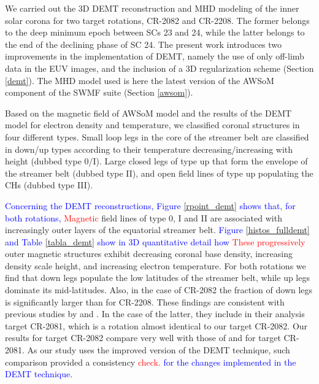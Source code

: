 \documentclass[namedreferences]{solarphysics}
\def\edit#1{\textcolor{Red}{#1}}
\def\del#1{\textcolor{Blue}{#1}}
\begin{document}
\begin{article}
We carried out the 3D DEMT reconstruction and MHD modeling of the inner solar corona for two target rotations, CR-2082 and CR-2208. The former belongs to the deep minimum epoch between SCs 23 and 24, while the latter belongs to the end of the declining phase of SC 24. The present work introduces two improvements in the implementation of DEMT, namely the use of only off-limb data in the EUV images, and the inclusion of a 3D regularization scheme (Section \ref{demt}). The MHD model used is here the latest version of the AWSoM component of the SWMF suite  (Section \ref{awsom}).

{Based on the magnetic field of AWSoM model and the results of the DEMT model for electron density and temperature, we classified coronal structures in four different types. {Small loop legs} in the core of the streamer belt are classified in down/up types according to their temperature decreasing/increasing with height (dubbed type 0/I). {Large closed legs} of type up that form the envelope of the streamer belt (dubbed type II), and open field lines of type up populating the CHs (dubbed type III).}

\del{Concerning the DEMT reconstructions, Figure \ref{rpoint_demt} shows that, for both rotations,} \edit{Magnetic} field lines of type 0, I and II are associated with increasingly outer {layers} of the equatorial streamer belt. \del{Figure \ref{histos_fulldemt} and Table \ref{tabla_demt} show in 3D quantitative detail how} \edit{These progressively} outer magnetic structures exhibit decreasing coronal base density, increasing density scale height, and increasing electron temperature. For both rotations we find that down legs populate the low latitudes of the streamer belt, while up legs dominate its mid-latitudes. Also, in the case of CR-2082 the fraction of down legs is significantly larger than for CR-2208. These findings are consistent with previous studies by \citet{huang_2012} and \citet{nuevo_2013}. In the case of the latter, they include in their analysis target CR-2081, which is a rotation almost identical to our target CR-2082. Our results for target CR-2082 compare very well with those of \citet{nuevo_2015} and \citet{lloveras_2017} for target CR-2081. As our study uses the improved version of the DEMT technique, such comparison provided a consistency \edit{check.} \del{for the changes implemented in the DEMT technique.}


\end{article}
\end{document}

